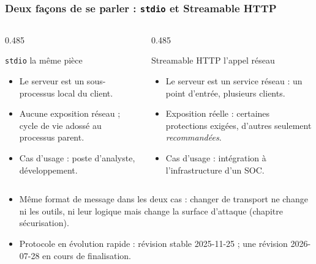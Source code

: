 \documentclass[aspectratio=169,11pt]{beamer}
\begin{document}
\begin{frame}
  \frametitle{Deux façons de se parler : \texttt{stdio} et Streamable HTTP}
  \vspace{0.1cm}
  \begin{columns}[T]
    \begin{column}{0.485\textwidth}
      \begin{exampleblock}{\texttt{stdio} la même pièce}
        \footnotesize
        \begin{itemize}\setlength\itemsep{0.3em}
          \item Le serveur est un sous-processus local du client.
          \item Aucune exposition réseau ; cycle de vie adossé au
            processus parent.
          \item Cas d'usage : poste d'analyste, développement.
        \end{itemize}
      \end{exampleblock}
    \end{column}
    \begin{column}{0.485\textwidth}
      \begin{block}{Streamable HTTP l'appel réseau}
        \footnotesize
        \begin{itemize}\setlength\itemsep{0.3em}
          \item Le serveur est un service réseau : un point d'entrée,
            plusieurs clients.
          \item Exposition réelle : certaines protections exigées,
            d'autres seulement \emph{recommandées}.
          \item Cas d'usage : intégration à l'infrastructure d'un SOC.
        \end{itemize}
      \end{block}
    \end{column}
  \end{columns}
  \vspace{0.25cm}
  \begin{itemize}
    \item<2-> Même format de message dans les deux cas : changer de
      transport ne change ni les outils, ni leur logique mais change la
      surface d'attaque (chapitre sécurisation).
    \item<3-> Protocole en évolution rapide : révision stable
      2025-11-25 ; une révision 2026-07-28 en cours de finalisation.
  \end{itemize}
\end{frame}
 
\end{document}
